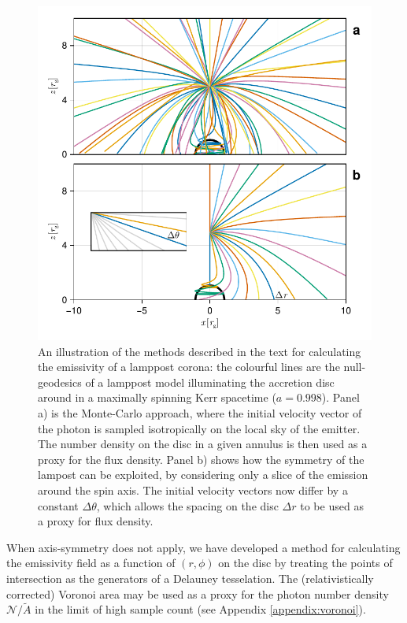 \documentclass[fleqn,usenatbib]{mnras}
\begin{document}
\begin{figure}
    \centering
    \includegraphics[width=0.95\linewidth]{figures/emissivity.coronal-traces.pdf}
    \caption{An illustration of the methods described in the text for
        calculating the emissivity of a lamppost corona: the colourful lines are
        the null-geodesics of a lamppost model illuminating the accretion disc
        around in a maximally spinning Kerr spacetime ($a = 0.998$). Panel a) is
        the Monte-Carlo approach, where the initial velocity vector of the
        photon is sampled isotropically on the local sky of the emitter. The
        number density on the disc in a given annulus is then used as a proxy
        for the flux density. Panel b) shows how the symmetry of the lampost can
        be exploited, by considering only a slice of the emission around the
        spin axis. The initial velocity vectors now differ by a constant $\Delta
    \theta$, which allows the spacing on the disc $\Delta r$ to be used as a
proxy for flux density.}
    \label{fig:coronal-tracing}
\end{figure}

When axis-symmetry does not apply, we have developed a method for calculating
the emissivity field as a function of $(r, \phi)$ on the disc by treating the
points of intersection as the generators of a Delauney tesselation. The
(relativistically corrected) Voronoi area may be used as a proxy for the photon
number density $\mathcal{N} /\tilde{A}$  in the limit of high sample count (see
Appendix \ref{appendix:voronoi}).
\end{document}
